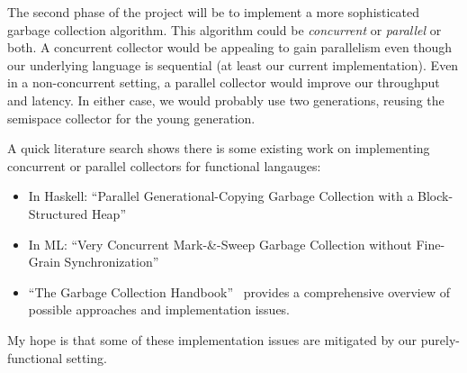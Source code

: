 \documentclass{article}
\begin{document}
The second phase of the project will be to implement a more sophisticated garbage collection algorithm. This algorithm could be \emph{concurrent} or \emph{parallel} or both. A concurrent collector would be appealing to gain parallelism even though our underlying language is sequential (at least our current implementation). Even in a non-concurrent setting, a parallel collector would improve our throughput and latency. In either case, we would probably use two generations, reusing the semispace collector for the young generation.

A quick literature search shows there is some existing work on implementing concurrent or parallel collectors for functional langauges:
\begin{itemize}
\item In Haskell: ``Parallel Generational-Copying Garbage Collection with a Block-Structured Heap''~\cite{marlow:parallel}
\item In ML: ``Very Concurrent Mark-\&-Sweep Garbage Collection without Fine-Grain Synchronization''~\cite{Huelsbergen}
\item ``The Garbage Collection Handbook''~\cite{gcbook} provides a comprehensive overview of possible approaches and implementation issues.
\end{itemize}

My hope is that some of these implementation issues are mitigated by our purely-functional setting.



\end{document}
